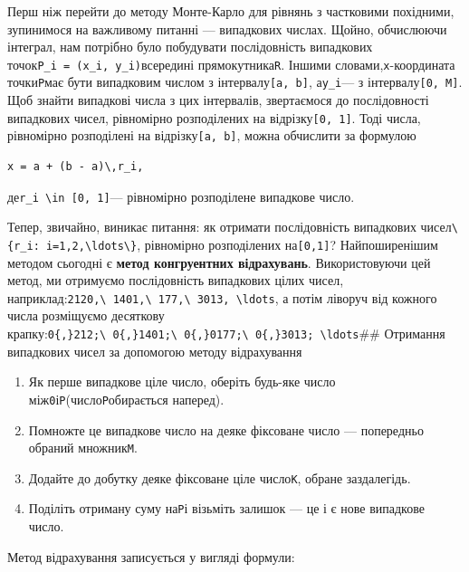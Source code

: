 \documentclass[
  ukrainian,
]{article}
\providecommand{\tightlist}{%
  \setlength{\itemsep}{0pt}\setlength{\parskip}{0pt}}
\begin{document}
Перш ніж перейти до методу Монте-Карло для рівнянь з частковими
похідними, зупинимося на важливому питанні --- випадкових числах. Щойно,
обчислюючи інтеграл, нам потрібно було побудувати послідовність
випадкових точок\texttt{P\_i\ =\ (x\_i,\ y\_i)}всередині
прямокутника\texttt{R}. Іншими словами,\texttt{x}-координата
точки\texttt{P}має бути випадковим числом з
інтервалу\texttt{{[}a,\ b{]}}, а\texttt{y\_i}--- з
інтервалу\texttt{{[}0,\ M{]}}. Щоб знайти випадкові числа з цих
інтервалів, звертаємося до послідовності випадкових чисел, рівномірно
розподілених на відрізку\texttt{{[}0,\ 1{]}}. Тоді числа, рівномірно
розподілені на відрізку\texttt{{[}a,\ b{]}}, можна обчислити за формулою

\begin{verbatim}
x = a + (b - a)\,r_i,
\end{verbatim}

де\texttt{r\_i\ \textbackslash{}in\ {[}0,\ 1{]}}--- рівномірно
розподілене випадкове число.

Тепер, звичайно, виникає питання: як отримати послідовність випадкових
чисел\texttt{\textbackslash{}\{r\_i:\ i=1,2,\textbackslash{}ldots\textbackslash{}\}},
рівномірно розподілених на\texttt{{[}0,1{]}}? Найпоширенішим методом
сьогодні є \textbf{метод конгруентних відрахувань}. Використовуючи цей
метод, ми отримуємо послідовність випадкових цілих чисел,
наприклад:\texttt{2120,\textbackslash{}\ 1401,\textbackslash{}\ 177,\textbackslash{}\ 3013,\ \textbackslash{}ldots},
а потім ліворуч від кожного числа розміщуємо десяткову
крапку:\texttt{0\{,\}212;\textbackslash{}\ 0\{,\}1401;\textbackslash{}\ 0\{,\}0177;\textbackslash{}\ 0\{,\}3013;\ \textbackslash{}ldots}\#\#
Отримання випадкових чисел за допомогою методу відрахування

\begin{enumerate}
\def\labelenumi{\arabic{enumi}.}
\tightlist
\item
  Як перше випадкове ціле число, оберіть будь-яке число
  між\texttt{0}і\texttt{P}(число\texttt{P}обирається наперед).
\item
  Помножте це випадкове число на деяке фіксоване число --- попередньо
  обраний множник\texttt{M}.
\item
  Додайте до добутку деяке фіксоване ціле число\texttt{K}, обране
  заздалегідь.
\item
  Поділіть отриману суму на\texttt{P}і візьміть залишок --- це і є нове
  випадкове число.
\end{enumerate}

Метод відрахування записується у вигляді формули:
\end{document}

